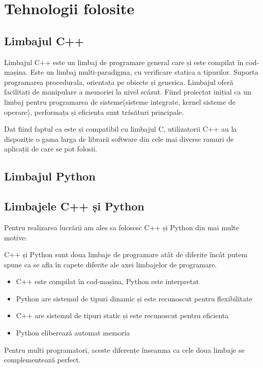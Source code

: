 \section{Tehnologii folosite}

\subsection{Limbajul C++}

Limbajul C++ este un limbaj de programare general care și este compilat în cod-mașina.
Este un limbaj multi-paradigma, cu verificare statica a tipurilor. 
Suporta programarea procedurala, orientata pe obiecte și generica.
Limbajul oferă facilitați de manipulare a memoriei la nivel scăzut.
Fiind proiectat inițial ca un limbaj pentru programarea de sisteme(sisteme integrate, kernel sisteme de operare), performața și eficienta sunt trăsături principale.

Dat fiind faptul ca este și compatibil cu limbajul C, utilizatorii C++ au la dispoziție o gama larga de librarii software din cele mai diverse ramuri de aplicații de care se pot folosii.

\subsection{Limbajul Python}



\subsection{Limbajele C++ și Python}
Pentru realizarea lucrării am ales sa folosesc C++ și Python din mai multe motive:

C++ și Python sunt doua limbaje de programare atât de diferite încât putem spune ca se afla în capete diferite ale axei limbajelor de programare.
\begin{itemize}
	\item C++ este compilat în cod-mașina, Python este interpretat
	\item Python are sistemul de tipuri dinamic și este recunoscut pentru flexibilitate
	\item C++ are sistemul de tipuri static și este recunoscut pentru eficienta
	\item Python eliberează automat memoria
\end{itemize}

Pentru multi programatori, aceste diferențe înseamna ca cele doua limbaje se complementează perfect.

